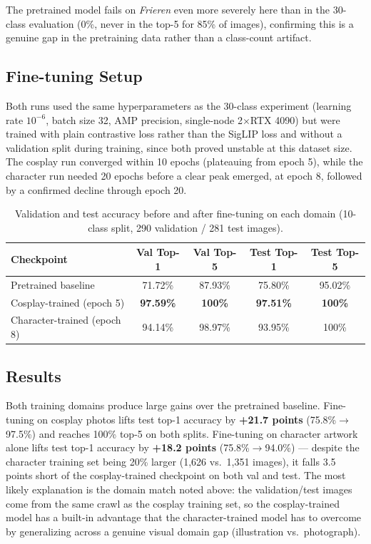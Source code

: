 The pretrained model fails on \textit{Frieren} even more severely here than
in the 30-class evaluation (0\%, never in the top-5 for 85\% of images),
confirming this is a genuine gap in the pretraining data rather than a
class-count artifact.

\subsection{Fine-tuning Setup}

Both runs used the same hyperparameters as the 30-class experiment (learning
rate $10^{-6}$, batch size 32, AMP precision, single-node 2$\times$RTX 4090)
but were trained with plain contrastive loss rather than the SigLIP loss and
without a validation split during training, since both proved unstable at
this dataset size. The cosplay run converged within 10 epochs (plateauing
from epoch 5), while the character run needed 20 epochs before a clear peak
emerged, at epoch 8, followed by a confirmed decline through epoch 20.

\begin{table}[h]
\centering
\begin{tabular}{lcccc}
\toprule
\textbf{Checkpoint} & \textbf{Val Top-1} & \textbf{Val Top-5} & \textbf{Test Top-1} & \textbf{Test Top-5} \\
\midrule
Pretrained baseline         & 71.72\% & 87.93\%  & 75.80\% & 95.02\% \\
Cosplay-trained (epoch 5)   & \textbf{97.59\%} & \textbf{100\%} & \textbf{97.51\%} & \textbf{100\%} \\
Character-trained (epoch 8) & 94.14\% & 98.97\%  & 93.95\% & 100\%  \\
\bottomrule
\end{tabular}
\caption{Validation and test accuracy before and after fine-tuning on each
domain (10-class split, 290 validation / 281 test images).}
\label{tab:domain_finetune}
\end{table}

\subsection{Results}

Both training domains produce large gains over the pretrained baseline.
Fine-tuning on cosplay photos lifts test top-1 accuracy by
\textbf{+21.7 points} (75.8\%$\to$97.5\%) and reaches 100\% top-5 on both
splits. Fine-tuning on character artwork alone lifts test top-1 accuracy by
\textbf{+18.2 points} (75.8\%$\to$94.0\%) --- despite the character training
set being 20\% larger (1{,}626 vs.\ 1{,}351 images), it falls 3.5 points
short of the cosplay-trained checkpoint on both val and test. The most
likely explanation is the domain match noted above: the validation/test
images come from the same crawl as the cosplay training set, so the
cosplay-trained model has a built-in advantage that the character-trained
model has to overcome by generalizing across a genuine visual domain gap
(illustration vs.\ photograph).

